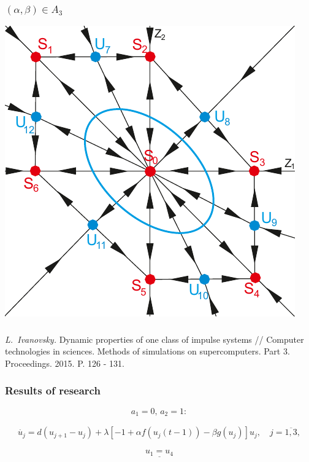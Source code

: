 \documentclass[fullscreen=true, unicode, bookmarks=false]{beamer}
\begin{document}
\begin{frame}
\frametitle{$ (\alpha, \beta) \in A_3 $} 
\begin{center}
  \includegraphics[scale=0.85]{transarea.pdf}  
 \end{center}
\end{frame}

\begin{frame}
\frametitle{} 

\textit{L.~Ivanovsky. } 
{Dynamic properties of one class of impulse systems //
Computer technologies in sciences. Methods of simulations on supercomputers. Part 3. Proceedings. 2015. P. 126 - 131. }


\end{frame}

\begin{frame}
\frametitle{Results of research} 

$$ a_1 = 0, \, a_2 = 1: $$

\begin{eqnarray}
	\dot{u_j} = d(u_{j+1}-u_j)+\lambda[-1+\alpha f(u_j(t-1)) - \beta g(u_j)]u_j, \quad j=\overline{1,3}, \nonumber
\end{eqnarray}		

$$ \underline{u_1=u_4} $$

\end{frame}
\end{document}
